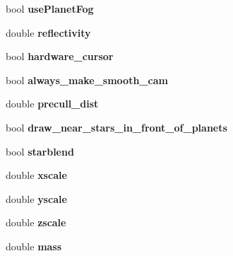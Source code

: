 \begin{DoxyCompactItemize}
\item 
bool {\bfseries use\+Planet\+Fog}\hypertarget{classvs__options_ab6f17cafc679efba789accdc576a1efb}{}\label{classvs__options_ab6f17cafc679efba789accdc576a1efb}

\item 
double {\bfseries reflectivity}\hypertarget{classvs__options_a7b1546b92f7d1e41066f862194d6c840}{}\label{classvs__options_a7b1546b92f7d1e41066f862194d6c840}

\item 
bool {\bfseries hardware\+\_\+cursor}\hypertarget{classvs__options_a6542ab58d0e57139703a3abd6004bcd2}{}\label{classvs__options_a6542ab58d0e57139703a3abd6004bcd2}

\item 
bool {\bfseries always\+\_\+make\+\_\+smooth\+\_\+cam}\hypertarget{classvs__options_afe82718c676343100cfdae13b733ba8d}{}\label{classvs__options_afe82718c676343100cfdae13b733ba8d}

\item 
double {\bfseries precull\+\_\+dist}\hypertarget{classvs__options_ac924df15925543307637c03070c921a3}{}\label{classvs__options_ac924df15925543307637c03070c921a3}

\item 
bool {\bfseries draw\+\_\+near\+\_\+stars\+\_\+in\+\_\+front\+\_\+of\+\_\+planets}\hypertarget{classvs__options_a4b2e00f5262c08eff102abda9b1efa50}{}\label{classvs__options_a4b2e00f5262c08eff102abda9b1efa50}

\item 
bool {\bfseries starblend}\hypertarget{classvs__options_a599e6d224f58e4a22daf5acf8c4230e5}{}\label{classvs__options_a599e6d224f58e4a22daf5acf8c4230e5}

\item 
double {\bfseries xscale}\hypertarget{classvs__options_a1a26fa06242e9f965bac0b5b44b384a9}{}\label{classvs__options_a1a26fa06242e9f965bac0b5b44b384a9}

\item 
double {\bfseries yscale}\hypertarget{classvs__options_ab62f4ef6ae5d8d9c0f5ef200ebd5f6bd}{}\label{classvs__options_ab62f4ef6ae5d8d9c0f5ef200ebd5f6bd}

\item 
double {\bfseries zscale}\hypertarget{classvs__options_ade228a105c38f09dd04a9f9ade943d22}{}\label{classvs__options_ade228a105c38f09dd04a9f9ade943d22}

\item 
double {\bfseries mass}\hypertarget{classvs__options_ae5b368795b50687205b4168640e4b721}{}\label{classvs__options_ae5b368795b50687205b4168640e4b721}


\end{DoxyCompactItemize}
